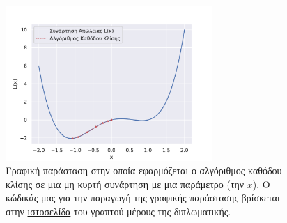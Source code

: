 \begin{figure}[h]
  \centering
  \includegraphics[width=0.7\textwidth]{images/chapter theoritical background/gd_init_at_plus0point1.pdf}
  \caption{Γραφική παράσταση στην οποία εφαρμόζεται ο αλγόριθμος καθόδου κλίσης σε μια μη κυρτή συνάρτηση με μια παράμετρο (την $x$). Ο κώδικάς μας για την παραγωγή της γραφικής παράστασης βρίσκεται στην \href{https://github.com/abarmper/Thesis_Barmperis}{ιστοσελίδα} του γραπτού μέρους της διπλωματικής. }
  \label{fig:_gd01}
\end{figure}

